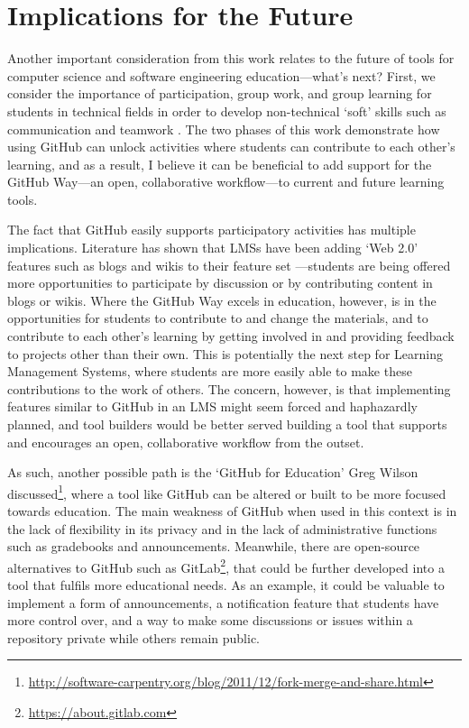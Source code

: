\section{Implications for the Future}
Another important consideration from this work relates to the future of tools for computer science and software engineering education---what's next? First, we consider the importance of participation, group work, and group learning for students in technical fields in order to develop non-technical `soft' skills such as communication and teamwork \cite{jazayeri2004education}. The two phases of this work demonstrate how using GitHub can unlock activities where students can contribute to each other's learning, and as a result, I believe it can be beneficial to add support for the GitHub Way---an open, collaborative workflow---to current and future learning tools.

The fact that GitHub easily supports participatory activities has multiple implications. Literature has shown that LMSs have been adding `Web 2.0' features such as blogs and wikis to their feature set \cite{downes2005feature}---students are being offered more opportunities to participate by discussion or by contributing content in blogs or wikis. Where the GitHub Way excels in education, however, is in the opportunities for students to contribute to and change the materials, and to contribute to each other's learning by getting involved in and providing feedback to projects other than their own. This is potentially the next step for Learning Management Systems, where students are more easily able to make these contributions to the work of others. The concern, however, is that implementing features similar to GitHub in an LMS might seem forced and haphazardly planned, and tool builders would be better served building a tool that supports and encourages an open, collaborative workflow from the outset.

As such, another possible path is the `GitHub for Education' Greg Wilson discussed\footnote{\url{http://software-carpentry.org/blog/2011/12/fork-merge-and-share.html}}, where a tool like GitHub can be altered or built to be more focused towards education. The main weakness of GitHub when used in this context is in the lack of flexibility in its privacy and in the lack of administrative functions such as gradebooks and announcements. Meanwhile, there are open-source alternatives to GitHub such as GitLab\footnote{\url{https://about.gitlab.com}}, that could be further developed into a tool that fulfils more educational needs. As an example, it could be valuable to implement a form of announcements, a notification feature that students have more control over, and a way to make some discussions or issues within a repository private while others remain public.

